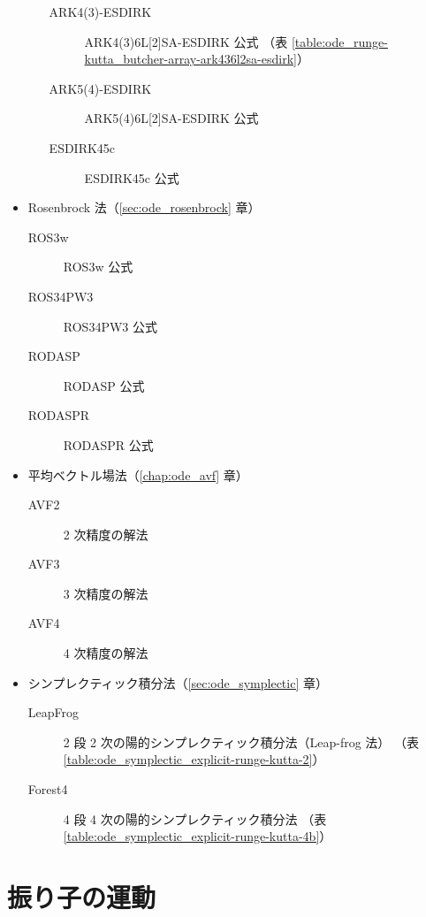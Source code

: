 \begin{itemize}
\begin{itemize}
\begin{description}
                        \item[ARK4(3)-ESDIRK] ARK4(3)6L[2]SA-ESDIRK 公式 \cite{Kennedy2003}
                              （表 \ref{table:ode_runge-kutta_butcher-array-ark436l2sa-esdirk}）
                        \item[ARK5(4)-ESDIRK] ARK5(4)6L[2]SA-ESDIRK 公式 \cite{Kennedy2003}
                        \item[ESDIRK45c] ESDIRK45c 公式 \cite{Jorgensen2018}
                    \end{description}
          \end{itemize}
    \item Rosenbrock 法（\ref{sec:ode_rosenbrock} 章）
          \begin{description}
              \item[ROS3w] ROS3w 公式 \cite{Rang2005}
              \item[ROS34PW3] ROS34PW3 公式 \cite{Rang2005}
              \item[RODASP] RODASP 公式 \cite{Steinebach2022}
              \item[RODASPR] RODASPR 公式 \cite{Rang2015}
          \end{description}
    \item 平均ベクトル場法（\ref{chap:ode_avf} 章）
          \begin{description}
              \item[AVF2] 2 次精度の解法
              \item[AVF3] 3 次精度の解法
              \item[AVF4] 4 次精度の解法
          \end{description}
    \item シンプレクティック積分法（\ref{sec:ode_symplectic} 章）
          \begin{description}
              \item[LeapFrog] 2 段 2 次の陽的シンプレクティック積分法（Leap-frog 法） \cite{Forest1990}
                    （表 \ref{table:ode_symplectic_explicit-runge-kutta-2}）
              \item[Forest4] 4 段 4 次の陽的シンプレクティック積分法 \cite{Forest1990}
                    （表 \ref{table:ode_symplectic_explicit-runge-kutta-4b}）
          \end{description}
\end{itemize}

\section{振り子の運動}

